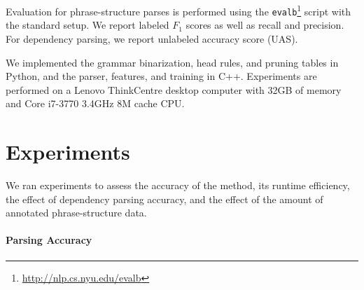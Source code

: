 \documentclass[11pt,letterpaper]{article}
\DeclareMathOperator*{\argmin}{arg\,min}
\newcommand{\ParserUrl}{\url{https://github.com/ikekonglp/PAD}}
\newcommand{\lpkcomment}[1]{\textcolor{red}{\bf \small [#1 --lpk]}}
\newcommand{\nascomment}[1]{\textcolor{blue}{\bf \small [#1 --nas]}}
\begin{document}




Evaluation for phrase-structure parses is performed using the
\texttt{evalb}\footnote{\url{http://nlp.cs.nyu.edu/evalb}} script with the
standard setup. We report labeled $F_1$ scores as well as recall and
precision. For dependency parsing, we report unlabeled accuracy score
(UAS).

We implemented the grammar binarization, head rules, and pruning
tables in Python, and the parser, features, and training in C++. 
Experiments are performed on a Lenovo ThinkCentre desktop computer
with 32GB of memory and  Core i7-3770 3.4GHz 8M cache CPU.



\section{Experiments}
\label{sec:exper}

We ran experiments to assess the accuracy of the method, its runtime
efficiency, the effect of dependency parsing accuracy,
and the effect of the amount of annotated phrase-structure
data.


\paragraph{Parsing Accuracy}
\end{document}

